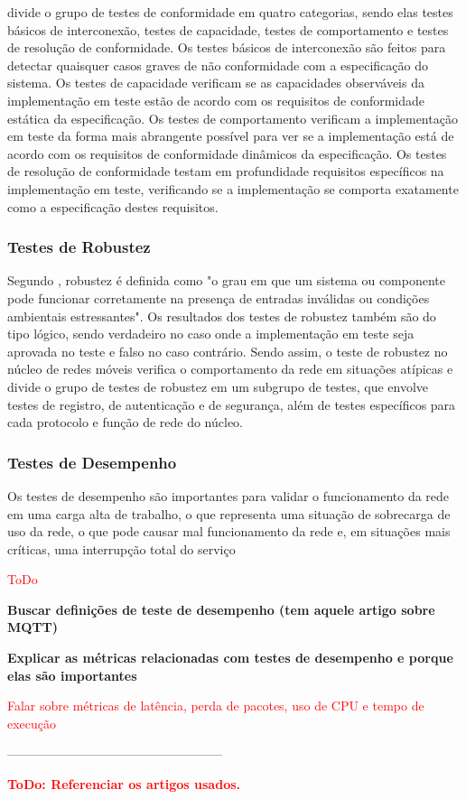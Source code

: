 \cite{Rayner1987} divide o grupo de testes de conformidade em quatro categorias, sendo elas testes básicos de interconexão, testes de capacidade, testes de comportamento e testes de resolução de conformidade.
Os testes básicos de interconexão são feitos para detectar quaisquer casos graves de não conformidade com a especificação do sistema.
Os testes de capacidade verificam se as capacidades observáveis da implementação em teste estão de acordo com os requisitos de conformidade estática da especificação.
Os testes de comportamento verificam a implementação em teste da forma mais abrangente possível para ver se a implementação está de acordo com os requisitos de conformidade dinâmicos da especificação.
Os testes de resolução de conformidade testam em profundidade requisitos específicos na implementação em teste, verificando se a implementação se comporta exatamente como a especificação destes requisitos.

\subsubsection{Testes de Robustez}

Segundo \cite{IEEE.Standard.Glossary}, robustez é definida como "o grau em que um sistema ou componente pode funcionar corretamente na presença de entradas inválidas ou condições ambientais estressantes".
Os resultados dos testes de robustez também são do tipo lógico, sendo verdadeiro no caso onde a implementação em teste seja aprovada no teste e falso no caso contrário.
Sendo assim, o teste de robustez no núcleo de redes móveis verifica o comportamento da rede em situações atípicas e \cite{Dominato2021} divide o grupo de testes de robustez em um subgrupo de testes, que envolve testes de registro, de autenticação e de segurança, além de testes específicos para cada protocolo e função de rede do núcleo.

\subsubsection{Testes de Desempenho}

Os testes de desempenho são importantes para validar o funcionamento da rede em uma carga alta de trabalho, o que representa uma situação de sobrecarga de uso da rede, o que pode causar mal funcionamento da rede e, em situações mais críticas, uma interrupção total do serviço

\textcolor{red}{ToDo}

\textbf{Buscar definições de teste de desempenho (tem aquele artigo sobre MQTT)}

\textbf{Explicar as métricas relacionadas com testes de desempenho e porque elas são importantes}

\textcolor{red}{Falar sobre métricas de latência, perda de pacotes, uso de CPU e tempo de execução}

---------------------------------------------------

\textcolor{red}{\textbf{ToDo: Referenciar os artigos usados.}}



